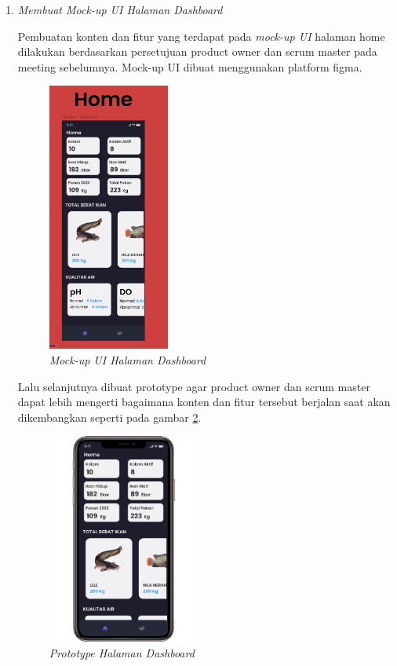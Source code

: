 \begin{enumerate}[listparindent=2em]
	
	\item{\textit{Membuat Mock-up UI Halaman Dashboard}}
	
	Pembuatan konten dan fitur yang terdapat pada \textit{mock-up UI} halaman home dilakukan berdasarkan persetujuan product owner dan scrum master pada meeting sebelumnya. Mock-up UI dibuat menggunakan platform figma.
	
	\begin{figure}[H]
	\centering
	\includegraphics[keepaspectratio, width=4cm]{gambar/mockuphome}
	\caption{\textit{Mock-up UI Halaman Dashboard}}
	\label{gambar:mockuphome}
	\end{figure}

	Lalu selanjutnya dibuat prototype agar product owner dan scrum master dapat lebih mengerti bagaimana konten dan fitur tersebut berjalan saat akan dikembangkan seperti pada gambar \ref{gambar:protohome}.

	\begin{figure}[H]
	\centering
	\includegraphics[keepaspectratio, width=5cm]{gambar/protohome}
	\caption{\textit{Prototype Halaman Dashboard}}
	\label{gambar:protohome}
	\end{figure}
	

\end{enumerate}
